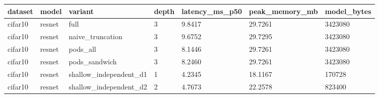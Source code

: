 \begin{tabular}{lllllll}
\hline
dataset & model & variant & depth & latency\_ms\_p50 & peak\_memory\_mb & model\_bytes \\
\hline
cifar10 & resnet & full & 3 & 9.8417 & 29.7261 & 3423080 \\
cifar10 & resnet & naive\_truncation & 3 & 9.6752 & 29.7295 & 3423080 \\
cifar10 & resnet & pods\_all & 3 & 8.1446 & 29.7261 & 3423080 \\
cifar10 & resnet & pods\_sandwich & 3 & 8.2460 & 29.7261 & 3423080 \\
cifar10 & resnet & shallow\_independent\_d1 & 1 & 4.2345 & 18.1167 & 170728 \\
cifar10 & resnet & shallow\_independent\_d2 & 2 & 4.7673 & 22.2578 & 823400 \\
\hline
\end{tabular}

